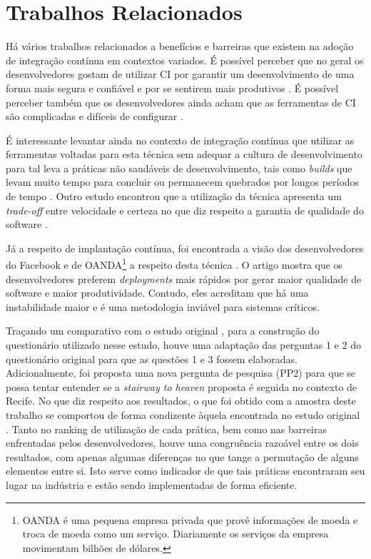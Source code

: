 \section{Trabalhos Relacionados}

Há vários trabalhos relacionados a benefícios e barreiras que existem na adoção de integração contínua em contextos variados. É possível perceber que no geral os desenvolvedores gostam de utilizar CI por garantir um desenvolvimento de uma forma mais segura e confiável \cite{googleCi} e por se sentirem mais produtivos \cite{hilton2016}. É possível perceber também que os desenvolvedores ainda acham que as ferramentas de CI são complicadas e difíceis de configurar \cite{hilton2016}. 

É interessante levantar ainda no contexto de integração contínua que utilizar as ferramentas voltadas para esta técnica sem adequar a cultura de desenvolvimento para tal leva a práticas não saudáveis de desenvolvimento, tais como \emph{builds} que levam muito tempo para concluir ou permanecem quebrados por longos períodos de tempo  \cite{citheater2019}. Outro estudo encontrou que a utilização da técnica apresenta um \emph{trade-off} entre velocidade e certeza no que diz respeito a garantia de qualidade do software \cite{hilton2016}.

Já a respeito de implantação contínua, foi encontrada a visão dos desenvolvedores do Facebook e de OANDA\footnote{OANDA é uma pequena empresa privada que provê informações de moeda e troca de moeda como um serviço. Diariamente os serviços da empresa movimentam bilhões de dólares.} a respeito desta técnica \cite{savor2015}. O artigo mostra que os desenvolvedores preferem \emph{deployments} mais rápidos por gerar maior qualidade de software e maior produtividade. Contudo, eles acreditam que há uma instabilidade maior e é uma metodologia inviável para sistemas críticos.

Traçando um comparativo com o estudo original \cite{empiricalStudy2016}, para a construção do questionário utilizado nesse estudo, houve uma adaptação das perguntas 1 e 2 do questionário original para que as questões 1 e 3 fossem elaboradas. Adicionalmente, foi proposta uma nova pergunta de pesquisa (PP2) para que se possa tentar entender se a \emph{stairway to heaven} proposta é seguida no contexto de Recife. No que diz respeito aos resultados, o que foi obtido com a amostra deste trabalho se comportou de forma condizente àquela encontrada no estudo original \cite{empiricalStudy2016}. Tanto no ranking de utilização de cada prática, bem como nas barreiras enfrentadas pelos desenvolvedores, houve uma congruência razoável entre os dois resultados, com apenas algumas diferenças no que tange a permutação de alguns elementos entre si. Isto serve como indicador de que tais práticas encontraram seu lugar na indústria e estão sendo implementadas de forma eficiente. 